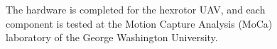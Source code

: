 \documentclass[twocolumn,letterpaper]{IEEEAerospaceCLS}  %
\begin{document}
\begin{figure}
\centerline{
	\hfill
	}
\centerline{
		\hfill
}	
\caption{The hardware is completed for the hexrotor UAV, and each component is tested at the Motion Capture Analysis (MoCa) laboratory of the George Washington University.}
\label{fig:hexrotorPicture}
\end{figure}
\end{document}
